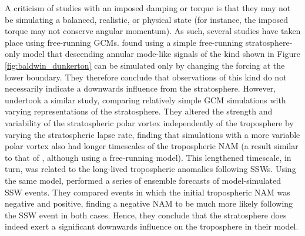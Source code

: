 A criticism of studies with an imposed damping or torque is that they may not be
simulating a balanced, realistic, or physical state (for instance, the imposed
torque may not conserve angular momentum). As such, several studies have taken
place using free-running GCMs. \citet{Plumb2003} found using a simple
free-running stratosphere-only model that descending annular mode-like signals
of the kind shown in Figure \ref{fig:baldwin_dunkerton} can be simulated only by
changing the forcing at the lower boundary. They therefore conclude that
observations of this kind do not necessarily indicate a downwards influence from
the stratosphere. However, \citet{Gerber2008} undertook a similar study,
comparing relatively simple GCM simulations with varying representations of the
stratosphere. They altered the strength and variability of the stratospheric
polar vortex independently of the troposphere by varying the stratospheric lapse
rate, finding that simulations with a more variable polar vortex also had longer
timescales of the tropospheric NAM (a result similar to that of
\citet{Simpson2011}, although using a free-running model). This lengthened
timescale, in turn, was related to the long-lived tropospheric anomalies
following SSWs. Using the same model, \citet{Gerber2009} performed a series of
ensemble forecasts of model-simulated SSW events. They compared events in which
the initial tropospheric NAM was negative and positive, finding a negative NAM
to be much more likely following the SSW event in both cases. Hence, they
conclude that the stratosphere does indeed exert a significant downwards
influence on the troposphere in their model.

